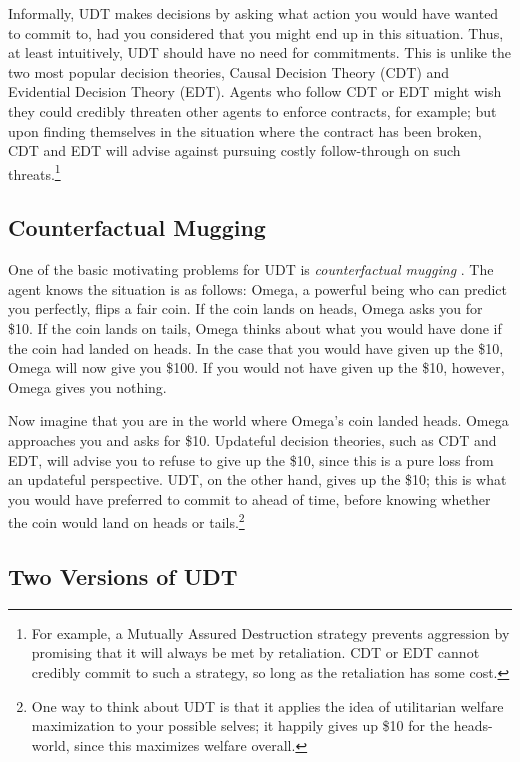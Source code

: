 \documentclass{article}
\begin{document}
Informally, UDT makes decisions by asking what action you would have wanted to commit to, had you considered that you might end up in this situation. Thus, at least intuitively, UDT should have no need for commitments. This is unlike the two most popular decision theories, Causal Decision Theory (CDT) and Evidential Decision Theory (EDT). Agents who follow CDT or EDT might wish they could credibly threaten other agents to enforce contracts, for example; but upon finding themselves in the situation where the contract has been broken, CDT and EDT will advise against pursuing costly follow-through on such threats.\footnote{For example, a Mutually Assured Destruction strategy prevents aggression by promising that it will always be met by retaliation. CDT or EDT cannot credibly commit to such a strategy, so long as the retaliation has some cost.}

\subsection{Counterfactual Mugging}\label{cfm}

One of the basic motivating problems for UDT is \emph{counterfactual mugging} \cite{nesov2009counterfactual}. The agent knows the situation is as follows: Omega, a powerful being who can predict you perfectly, flips a fair coin. If the coin lands on heads, Omega asks you for \$10. If the coin lands on tails, Omega thinks about what you would have done if the coin had landed on heads. In the case that you would have given up the \$10, Omega will now give you \$100. If you would not have given up the \$10, however, Omega gives you nothing.

Now imagine that you are in the world where Omega's coin landed heads. Omega approaches you and asks for \$10. Updateful decision theories, such as CDT and EDT, will advise you to refuse to give up the \$10, since this is a pure loss from an updateful perspective. UDT, on the other hand, gives up the \$10; this is what you would have preferred to commit to ahead of time, before knowing whether the coin would land on heads or tails.\footnote{One way to think about UDT is that it applies the idea of utilitarian welfare maximization to your possible selves; it happily gives up \$10 for the heads-world, since this maximizes welfare overall.}

\subsection{Two Versions of UDT}
\end{document}
